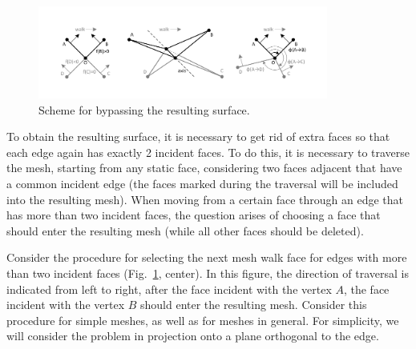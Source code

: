 \documentclass[
11pt,
tightenlines,
twoside,
onecolumn,
nofloats,
nobibnotes,
nofootinbib,
superscriptaddress,
noshowpacs,
centertags]
{revtex4}
\begin{document}
\begin{figure}[h]
\includegraphics[width=0.85\textwidth]{pics/pic_walk_1_size.pdf}
\caption{Scheme for bypassing the resulting surface.}\label{fig:pic_walk}
\end{figure}

To obtain the resulting surface, it is necessary to get rid of extra faces so that each edge again has exactly 2 incident faces.
To do this, it is necessary to traverse the mesh, starting from any static face, considering two faces adjacent that have a common incident edge (the faces marked during the traversal will be included into the resulting mesh).
When moving from a certain face through an edge that has more than two incident faces, the question arises of choosing a face that should enter the resulting mesh (while all other faces should be deleted).

Consider the procedure for selecting the next mesh walk face for edges with more than two incident faces (Fig.~\ref{fig:pic_walk}, center).
In this figure, the direction of traversal is indicated from left to right, after the face incident with the vertex $A$, the face incident with the vertex $B$ should enter the resulting mesh.
Consider this procedure for simple meshes, as well as for meshes in general.
For simplicity, we will consider the problem in projection onto a plane orthogonal to the edge.
\end{document}
